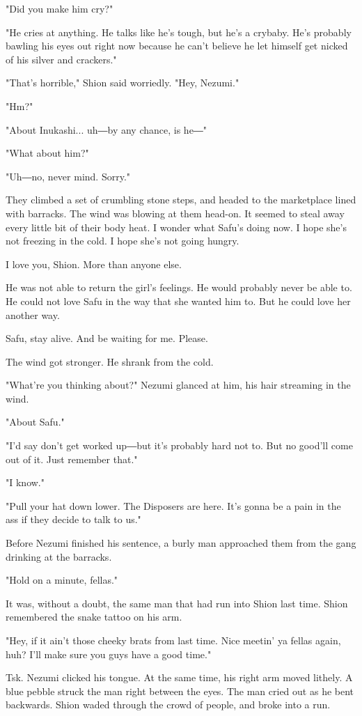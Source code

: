 "Did you make him cry?"

"He cries at anything. He talks like he's tough, but he's a crybaby.
He's probably bawling his eyes out right now because he can't believe he
let himself get nicked of his silver and crackers."

"That's horrible," Shion said worriedly. "Hey, Nezumi."

"Hm?"

"About Inukashi... uh―by any chance, is he―"

"What about him?"

"Uh―no, never mind. Sorry."

They climbed a set of crumbling stone steps, and headed to the
marketplace lined with barracks. The wind was blowing at them head-on.
It seemed to steal away every little bit of their body heat. I wonder
what Safu's doing now. I hope she's not freezing in the cold. I hope
she's not going hungry.

I love you, Shion. More than anyone else.

He was not able to return the girl's feelings. He would probably never
be able to. He could not love Safu in the way that she wanted him to.
But he could love her another way.

Safu, stay alive. And be waiting for me. Please.

The wind got stronger. He shrank from the cold.

"What're you thinking about?" Nezumi glanced at him, his hair streaming
in the wind.

"About Safu."

"I'd say don't get worked up―but it's probably hard not to. But no
good'll come out of it. Just remember that."

"I know."

"Pull your hat down lower. The Disposers are here. It's gonna be a pain
in the ass if they decide to talk to us."

Before Nezumi finished his sentence, a burly man approached them from
the gang drinking at the barracks.

"Hold on a minute, fellas."

It was, without a doubt, the same man that had run into Shion last time.
Shion remembered the snake tattoo on his arm.

"Hey, if it ain't those cheeky brats from last time. Nice meetin' ya
fellas again, huh? I'll make sure you guys have a good time."

Tsk. Nezumi clicked his tongue. At the same time, his right arm moved
lithely. A blue pebble struck the man right between the eyes. The man
cried out as he bent backwards. Shion waded through the crowd of people,
and broke into a run.

